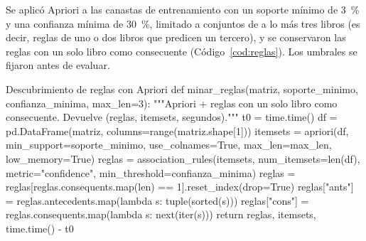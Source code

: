 \documentclass[11pt,letterpaper]{article}
\begin{document}
Se aplicó Apriori a las canastas de entrenamiento con un soporte mínimo de 3~\% y una confianza mínima de 30~\%, limitado a conjuntos de a lo más tres libros (es decir, reglas de uno o dos libros que predicen un tercero), y se conservaron las reglas con un solo libro como consecuente (Código~\ref{cod:reglas}). Los umbrales se fijaron antes de evaluar.

\begin{codigo}[label=cod:reglas]{Descubrimiento de reglas con Apriori}
def minar_reglas(matriz, soporte_minimo, confianza_minima, max_len=3):
    """Apriori + reglas con un solo libro como consecuente. Devuelve (reglas, itemsets, segundos)."""
    t0 = time.time()
    df = pd.DataFrame(matriz, columns=range(matriz.shape[1]))
    itemsets = apriori(df, min_support=soporte_minimo, use_colnames=True, max_len=max_len, low_memory=True)
    reglas = association_rules(itemsets, num_itemsets=len(df), metric="confidence", min_threshold=confianza_minima)
    reglas = reglas[reglas.consequents.map(len) == 1].reset_index(drop=True)
    reglas["ants"] = reglas.antecedents.map(lambda s: tuple(sorted(s)))
    reglas["cons"] = reglas.consequents.map(lambda s: next(iter(s)))
    return reglas, itemsets, time.time() - t0
\end{codigo}
\end{document}
